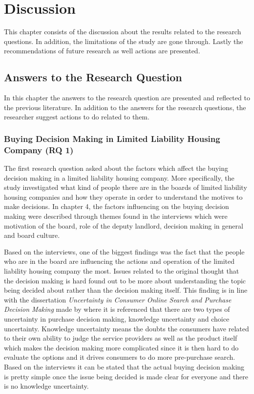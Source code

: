 \chapter{Discussion}
\label{chapter:discussion}

This chapter consists of the discussion about the results related to the research questions. In addition, the limitations of the study are gone through. Lastly the recommendations of future research as well actions are presented.

\section{Answers to the Research Question}

In this chapter the answers to the research question are presented and reflected to the previous literature. In addition to the answers for the research questions, the researcher suggest actions to do related to them.

\subsection{Buying Decision Making in Limited Liability Housing Company (RQ 1)}

The first research question asked about the factors which affect the buying decision making in a limited liability housing company. More specifically, the study investigated what kind of people there are in the boards of limited liability housing companies and how they operate in order to understand the motives to make decisions. In chapter 4, the factors influencing on the buying decision making were described through themes found in the interviews which were motivation of the board, role of the deputy landlord, decision making in general and board culture.

Based on the interviews, one of the biggest findings was the fact that the people who are in the board are influencing the actions and operation of the limited liability housing company the most. Issues related to the original thought that the decision making is hard found out to be more about understanding the topic being decided about rather than the decision making itself. This finding is in line with the dissertation \emph{Uncertainty in Consumer Online Search and Purchase Decision Making} made by \textcite{PurchaseDecisionMaking:2011} where it is referenced that there are two types of uncertainty in purchase decision making, knowledge uncertainty and choice uncertainty. Knowledge uncertainty means the doubts the consumers have related to their own ability to judge the service providers as well as the product itself which makes the decision making more complicated since it is then hard to do evaluate the options and it drives consumers to do more pre-purchase search. Based on the interviews it can be stated that the actual buying decision making is pretty simple once the issue being decided is made clear for everyone and there is no knowledge uncertainty.

